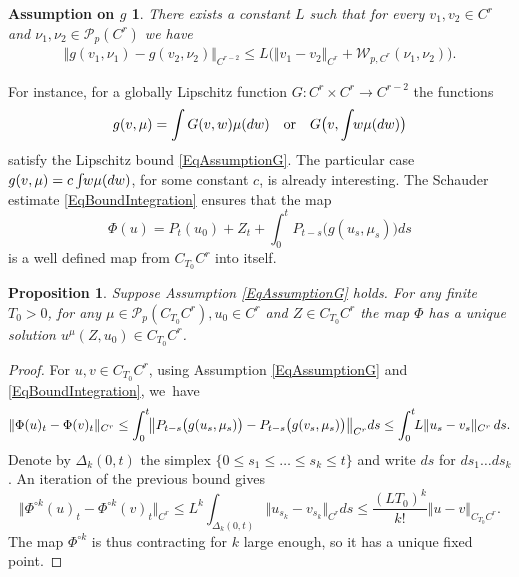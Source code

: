 \documentclass[10pt]{amsart}
\newtheorem{prop}[thm]{Proposition}
\newtheorem*{assg}{Assumption on $g$}
\theoremstyle{definition}
\newcommand{\mcP}{\mathcal{P}}
\newcommand{\norme}[1]{\Vert #1 \Vert}
\begin{document}
\begin{assg}
There exists a constant $L$ such that for every $v_1, v_2\in C^r$ and $\nu_1,\nu_2 \in \mcP_p(C^r)$ we have
\begin{equation} \label{EqAssumptionG} \begin{split}
\big\Vert g(v_1, \nu_1) - g(v_2,\nu_2)\big\Vert _{C^{r-2}} \leq L\bigl( \norme{v_1-v_2} _{C^r} + \mathcal{W}_{p,C^r}(\nu_1,\nu_2) \bigr).
\end{split} \end{equation}
\end{assg}
For instance, for a globally Lipschitz function $G : C^r\times C^r\to C^{r-2}$ the functions
\[
g(v,\mu) = \int G(v,w)\mu(dw)\quad \textrm{or} \quad G\bigl(v,\int \hspace{-0.1cm}w\mu(dw)\bigr)
\]
satisfy the Lipschitz bound \eqref{EqAssumptionG}. The particular case $g(v,\mu)=c\int\hspace{-0.1cm}w\mu(dw)$, for some constant $c$, is already interesting. The Schauder estimate \eqref{EqBoundIntegration} ensures that the map
\[
\Phi(u) = P_t(u_0) + Z_t + \int_0^t P_{t-s} \bigl(g(u_s,\mu_s)\bigr) ds
\]
is a well defined map from $C_{T_0} C^r$ into itself.

\begin{prop}
Suppose Assumption \eqref{EqAssumptionG} holds. For any finite $T_0>0$, for any $\mu\in \mathcal{P}_p(C_{T_0} C^r), u_0\in C^r$ and $Z\in C_{T_0}C^r$ the map $\Phi$ has a unique solution $u^\mu(Z,u_0)\in C_{T_0}C^r$.
\end{prop}

\begin{proof}
For $u,v\in C_{T_0}C^r$, using Assumption \eqref{EqAssumptionG} and \eqref{EqBoundIntegration}, we~have
\[
\norme{\Phi(u)_t-\Phi(v)_t}_{C^r} \leq \int_0^t\hspace*{-1mm} \big\Vert P_{t-s}\bigl(g(u_s,\mu_s)\bigr) - P_{t-s}\bigl(g(v_s,\mu_s)\bigr)\big\Vert_{C^r} ds \leq \int_0^t\hspace*{-1mm} L \norme{u_s-v_s}_{C^r} \, ds.
\]
Denote by $\Delta_k(0,t)$ the simplex $\{0\leq s_1 \leq \dots\leq s_k\leq t\} $ and write $ds$ for $ds_1\dots ds_k$. An iteration of the previous bound gives
\[
\norme{\Phi^{\circ k}(u)_t - \Phi^{\circ k}(v)_t}_{C^r} \leq L^k \int_{\Delta_k(0,t)} \norme{u_{s_k}-v_{s_k}}_{C^r} ds \leq\frac{(LT_0)^k}{k!} \norme{u-v}_{C_{T_0}C^r}.
\]
The map $\Phi^{ \circ k}$ is thus contracting for $k$ large enough, so it has a unique fixed point.
\end{proof}
\end{document}
